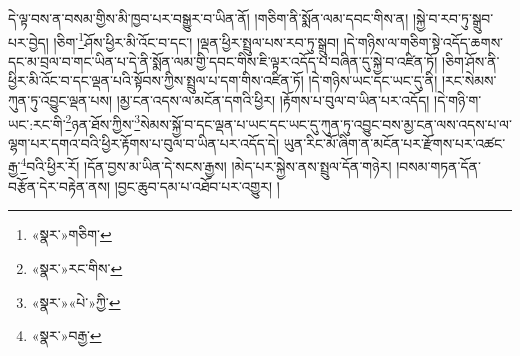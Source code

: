དེ་ལྟ་བས་ན་བསམ་གྱིས་མི་ཁྱབ་པར་བསྒྱུར་བ་ཡིན་ནོ། །གཅིག་ནི་སྨོན་ལམ་དབང་གིས་ན། །སྐྱེ་བ་རབ་ཏུ་སྒྲུབ་པར་བྱེད། །ཅིག་\footnote{«སྣར་»གཅིག་}ཤོས་ཕྱིར་མི་འོང་བ་དང་། །ལྡན་ཕྱིར་སྤྲུལ་པས་རབ་ཏུ་སྒྲུབ། །དེ་གཉིས་ལ་གཅིག་སྟེ་འདོད་ཆགས་དང་མ་བྲལ་བ་གང་ཡིན་པ་དེ་ནི་སྨོན་ལམ་གྱི་དབང་གིས་ཇི་ལྟར་འདོད་པ་བཞིན་དུ་སྐྱེ་བ་འཛིན་ཏོ། །ཅིག་ཤོས་ནི་ཕྱིར་མི་འོང་བ་དང་ལྡན་པའི་སྟོབས་ཀྱིས་སྤྲུལ་པ་དག་གིས་འཛིན་ཏོ། །དེ་གཉིས་ཡང་དང་ཡང་དུ་ནི། །རང་སེམས་ཀུན་ཏུ་འབྱུང་ལྡན་པས། །མྱ་ངན་འདས་ལ་མངོན་དགའི་ཕྱིར། །རྟོགས་པ་བུལ་བ་ཡིན་པར་འདོད། །དེ་གཉི་ག་ཡང་:རང་གི་\footnote{«སྣར་»རང་གིས་}ཉན་ཐོས་ཀྱིས་\footnote{«སྣར་»«པེ་»ཀྱི་}སེམས་སྐྱོ་བ་དང་ལྡན་པ་ཡང་དང་ཡང་དུ་ཀུན་ཏུ་འབྱུང་བས་མྱ་ངན་ལས་འདས་པ་ལ་ལྷག་པར་དགའ་བའི་ཕྱིར་རྟོགས་པ་བུལ་བ་ཡིན་པར་འདོད་དེ། ཡུན་རིང་མོ་ཞིག་ན་མངོན་པར་རྫོགས་པར་འཚང་རྒྱ་\footnote{«སྣར་»བརྒྱ་}བའི་ཕྱིར་རོ། །དོན་བྱས་མ་ཡིན་དེ་སངས་རྒྱས། །མེད་པར་སྐྱེས་ནས་སྤྲུལ་དོན་གཉེར། །བསམ་གཏན་དོན་བརྩོན་དེར་བརྟེན་ནས། །བྱང་ཆུབ་དམ་པ་འཐོབ་པར་འགྱུར། །
